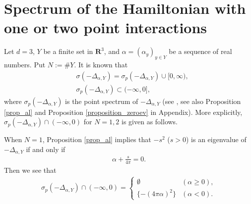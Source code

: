 \documentclass[12pt,a4paper]{article}
\begin{document}
\section{Spectrum of the Hamiltonian with one or two point interactions}
Let $d=3$,
$Y$ be a finite set in $\mathbf{R}^3$, and 
$\alpha=(\alpha_y)_{y\in Y}$ be a sequence of real numbers.
Put $N:=\#Y$.
It is known that
\begin{align*}
&\  \sigma(-\Delta_{\alpha,Y})
=
 \sigma_p(-\Delta_{\alpha,Y})\cup [0,\infty),\\
&\ 
 \sigma_p(-\Delta_{\alpha,Y})\subset (-\infty,0],
\end{align*}
where $\sigma_p(-\Delta_{\alpha,Y})$ is the point spectrum of 
$-\Delta_{\alpha,Y}$
(see \cite[Theorem II.1.1.4, and Errata in page 485]{Al-Ge-Ho-Ho},
see also Proposition \ref{prop_al} and Proposition \ref{proposition_zeroev} in Appendix).
More explicitly,
$\sigma_p(-\Delta_{\alpha,Y})\cap (-\infty, 0)$ for $N=1,2$ is given as follows.

When $N=1$,
Proposition \ref{prop_al} implies that 
$-s^2$ ($s>0$) is an eigenvalue of $-\Delta_{\alpha,Y}$
if and only if
\begin{align*}
 \alpha + \frac{s}{4\pi}=0.
\end{align*}
Then we see that
\begin{align*}
 \sigma_p(-\Delta_{\alpha,Y})\cap (-\infty,0)
=
\begin{cases}
 \emptyset & (\alpha \geq 0),\\
\{-(4\pi \alpha)^2\} & (\alpha <0).
\end{cases}
\end{align*}
\end{document}

